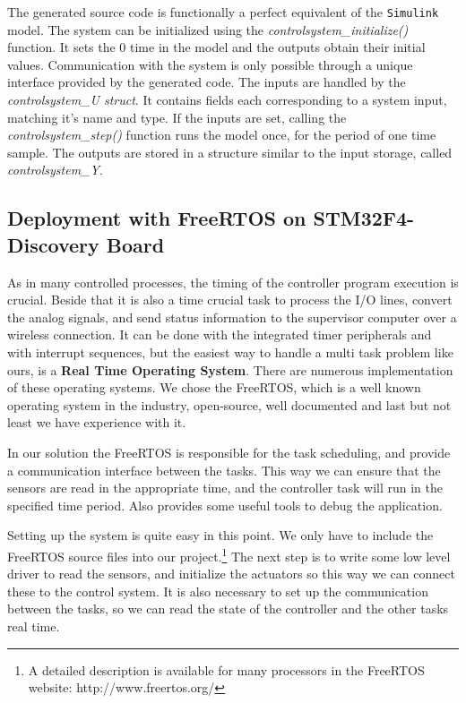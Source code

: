 The generated source code is functionally a perfect equivalent of the \verb!Simulink! model. The system can be initialized using the \emph{controlsystem\_initialize()} function. It sets the 0 time in the model and the outputs obtain their initial values. Communication with the system is only possible through a unique interface provided by the generated code. The inputs are handled by the \emph{controlsystem\_U struct}. It contains fields each corresponding to a system input, matching it's name and type. If the inputs are set, calling the \emph{controlsystem\_step()} function runs the model once, for the period of one time sample. The outputs are stored in a structure similar to the input storage, called \emph{controlsystem\_Y}.

\subsection{Deployment with FreeRTOS on STM32F4-Discovery Board}

As in many controlled processes, the timing of the controller program execution is crucial. Beside that it is also a time crucial task to process the I/O lines, convert the analog signals, and send status information to the supervisor computer over a wireless connection. It can be done with the integrated timer peripherals and with interrupt sequences, but the easiest way to handle a multi task problem like ours, is a \textbf{Real Time Operating System}. There are numerous implementation of these operating systems. We chose the FreeRTOS, which is a well known operating system in the industry, open-source, well documented and last but not least we have experience with it.

In our solution the FreeRTOS is responsible for the task scheduling, and provide a communication interface between the tasks. This way we can ensure that the sensors are read in the appropriate time, and the controller task will run in the specified time period. Also provides some useful tools to debug the application.

Setting up the system is quite easy in this point. We only have to include the FreeRTOS source files into our project.\footnote{A detailed description is available for many processors in the FreeRTOS website: http://www.freertos.org/} The next step is to write some low level driver to read the sensors, and initialize the actuators so this way we can connect these to the control system. It is also necessary to set up the communication between the tasks, so we can read the state of the controller and the other tasks real time.
